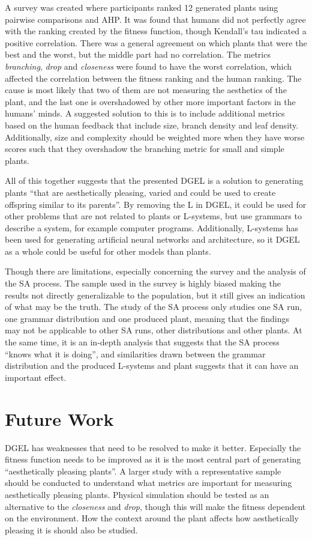 A survey was created where participants ranked 12 generated plants using pairwise comparisons and \gls{AHP}.
It was found that humans did not perfectly agree with the ranking created by the fitness function, though Kendall's tau indicated a positive correlation.
There was a general agreement on which plants that were the best and the worst, but the middle part had no correlation.
The metrics \textit{branching}, \textit{drop} and \textit{closeness} were found to have the worst correlation, which affected the correlation between the fitness ranking and the human ranking.
The cause is most likely that two of them are not measuring the aesthetics of the plant, and the last one is overshadowed by other more important factors in the humans' minds.
A suggested solution to this is to include additional metrics based on the human feedback that include size, branch density and leaf density.
Additionally, size and complexity should be weighted more when they have worse scores such that they overshadow the branching metric for small and simple plants.

All of this together suggests that the presented \gls{DGEL} is a solution to generating plants ``that are aesthetically pleasing, varied and could be used to create offspring similar to its parents''.
By removing the L in \gls{DGEL}, it could be used for other problems that are not related to plants or \glspl{L-system}, but use grammars to describe a system, for example computer programs.
Additionally, \glspl{L-system} has been used for generating artificial neural networks and architecture, so it \gls{DGEL} as a whole could be useful for other models than plants.

Though there are limitations, especially concerning the survey and the analysis of the \gls{SA} process.
The sample used in the survey is highly biased making the results not directly generalizable to the population, but it still gives an indication of what may be the truth.
The study of the \gls{SA} process only studies one \gls{SA} run, one grammar distribution and one produced plant, meaning that the findings may not be applicable to other \gls{SA} runs, other distributions and other plants.
At the same time, it is an in-depth analysis that suggests that the \gls{SA} process ``knows what it is doing'', and similarities drawn between the grammar distribution and the produced \glspl{L-system} and plant suggests that it can have an important effect.

\section{Future Work}
\gls{DGEL} has weaknesses that need to be resolved to make it better.
Especially the fitness function needs to be improved as it is the most central part of generating ``aesthetically pleasing plants''.
A larger study with a representative sample should be conducted to understand what metrics are important for measuring aesthetically pleasing plants.
Physical simulation should be tested as an alternative to the \textit{closeness} and \textit{drop}, though this will make the fitness dependent on the environment.
How the context around the plant affects how aesthetically pleasing it is should also be studied.

